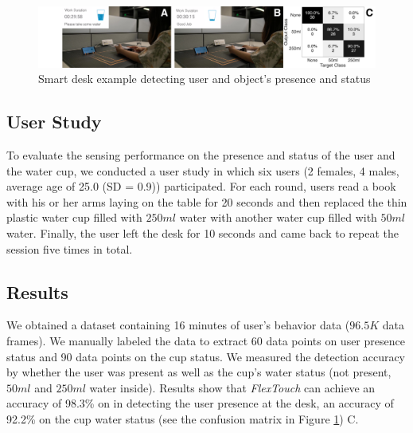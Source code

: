 \begin{figure}[ht]
\centering
  \includegraphics[width=0.8\columnwidth]{figures/FlexTouch-desk.png}
  \setlength{\belowcaptionskip}{-4pt}
  \caption{Smart desk example detecting user and object's presence and status}
  \label{fig:smartdesk}
\end{figure}

\subsection{User Study}
To evaluate the sensing performance on the presence and status of the user and the water cup, we conducted a user study in which six users (2 females, 4 males, average age of 25.0 (SD = 0.9)) participated. For each round, users read a book with his or her arms laying on the table for 20 seconds and then replaced the thin plastic water cup filled with $250 ml$ water with another water cup filled with $50 ml$ water. Finally, the user left the desk for 10 seconds and came back to repeat the session five times in total.

\subsection{Results}
We obtained a dataset containing 16 minutes of user's behavior data ($96.5 K$ data frames). We manually labeled the data to extract 60 data points on user presence status and 90 data points on the cup status. We measured the detection accuracy by whether the user was present as well as the cup's water status (not present, $50 ml$ and $250 ml$ water inside). Results show that \textit{FlexTouch} can achieve an accuracy of 98.3\% on in detecting the user presence at the desk, an accuracy of 92.2\% on the cup water status (see the confusion matrix in Figure \ref{fig:smartdesk}) C.

